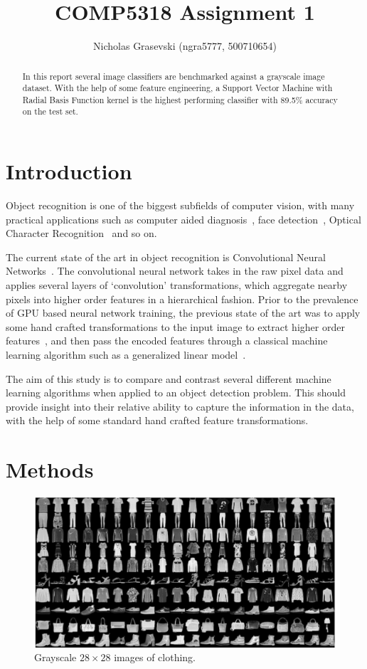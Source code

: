 \documentclass[landscape,twocolumn]{article}
\title{COMP5318 Assignment 1}
\author{Nicholas Grasevski (ngra5777, 500710654)}
\begin{document}
\maketitle
\begin{abstract}
	In this report several image classifiers are benchmarked against a grayscale image dataset. With the help of some feature engineering, a Support Vector Machine with Radial Basis Function kernel is the highest performing classifier with 89.5\% accuracy on the test set.
\end{abstract}

\section{Introduction}
Object recognition is one of the biggest subfields of computer vision, with many practical applications such as computer aided diagnosis~\cite{doi2007computer}, face detection~\cite{hjelmaas2001face}, Optical Character Recognition~\cite{mori1999optical} and so on.

The current state of the art in object recognition is Convolutional Neural Networks~\cite{iandola2016squeezenet}. The convolutional neural network takes in the raw pixel data and applies several layers of `convolution' transformations, which aggregate nearby pixels into higher order features in a hierarchical fashion. Prior to the prevalence of GPU based neural network training, the previous state of the art was to apply some hand crafted transformations to the input image to extract higher order features~\cite{rybski2010visual}, and then pass the encoded features through a classical machine learning algorithm such as a generalized linear model~\cite{ebrahimzadeh2014efficient}.

The aim of this study is to compare and contrast several different machine learning algorithms when applied to an object detection problem. This should provide insight into their relative ability to capture the information in the data, with the help of some standard hand crafted feature transformations.

\section{Methods}
\begin{figure}[ht]
	\includegraphics[width=\linewidth]{../Dataset_image}
	\caption{Grayscale $28 \times 28$ images of clothing.}\label{fig:images}
\end{figure}
\end{document}
